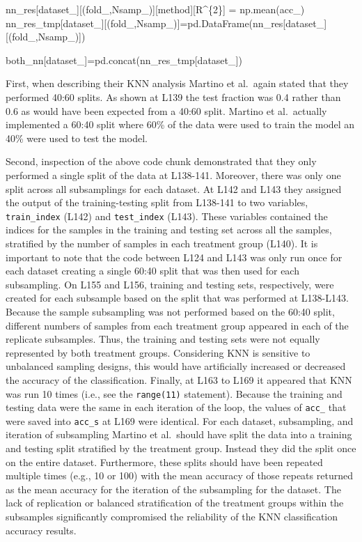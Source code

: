 \documentclass[
]{article}
\newenvironment{Shaded}{}{}
\newcommand{\NormalTok}[1]{\textcolor[rgb]{0.22,0.23,0.26}{#1}}
\newcommand{\OperatorTok}[1]{\textcolor[rgb]{0.65,0.15,0.64}{#1}}
\newcommand{\SpecialCharTok}[1]{\textcolor[rgb]{0.00,0.52,0.74}{#1}}
\newcommand{\StringTok}[1]{\textcolor[rgb]{0.31,0.63,0.31}{#1}}
\begin{document}
\begin{Shaded}
\begin{Highlighting}[numbers=left,,firstnumber=123,]
\NormalTok{        nn\_res[dataset\_][(fold\_,Nsamp\_)][method][}\StringTok{\textquotesingle{}R\^{}}\SpecialCharTok{\{2\}}\StringTok{\textquotesingle{}}\NormalTok{] }\OperatorTok{=}\NormalTok{ np.mean(acc\_)}
\NormalTok{        nn\_res\_tmp[dataset\_][(fold\_,Nsamp\_)]}\OperatorTok{=}\NormalTok{pd.DataFrame(nn\_res[dataset\_][(fold\_,Nsamp\_)])}

\NormalTok{  both\_nn[dataset\_]}\OperatorTok{=}\NormalTok{pd.concat(nn\_res\_tmp[dataset\_])}
\end{Highlighting}
\end{Shaded}

\normalsize{}

First, when describing their KNN analysis Martino et al.~again stated
that they performed 40:60 splits. As shown at L139 the test fraction was
0.4 rather than 0.6 as would have been expected from a 40:60 split.
Martino et al.~actually implemented a 60:40 split where 60\% of the data
were used to train the model an 40\% were used to test the model.

Second, inspection of the above code chunk demonstrated that they only
performed a single split of the data at L138-141. Moreover, there was
only one split across all subsamplings for each dataset. At L142 and
L143 they assigned the output of the training-testing split from
L138-141 to two variables, \texttt{train\_index} (L142) and
\texttt{test\_index} (L143). These variables contained the indices for
the samples in the training and testing set across all the samples,
stratified by the number of samples in each treatment group (L140). It
is important to note that the code between L124 and L143 was only run
once for each dataset creating a single 60:40 split that was then used
for each subsampling. On L155 and L156, training and testing sets,
respectively, were created for each subsample based on the split that
was performed at L138-L143. Because the sample subsampling was not
performed based on the 60:40 split, different numbers of samples from
each treatment group appeared in each of the replicate subsamples. Thus,
the training and testing sets were not equally represented by both
treatment groups. Considering KNN is sensitive to unbalanced sampling
designs, this would have artificially increased or decreased the
accuracy of the classification. Finally, at L163 to L169 it appeared
that KNN was run 10 times (i.e., see the \texttt{range(11)} statement).
Because the training and testing data were the same in each iteration of
the loop, the values of \texttt{acc\_} that were saved into
\texttt{acc\_s} at L169 were identical. For each dataset, subsampling,
and iteration of subsampling Martino et al.~should have split the data
into a training and testing split stratified by the treatment group.
Instead they did the split once on the entire dataset. Furthermore,
these splits should have been repeated multiple times (e.g., 10 or 100)
with the mean accuracy of those repeats returned as the mean accuracy
for the iteration of the subsampling for the dataset. The lack of
replication or balanced stratification of the treatment groups within
the subsamples significantly compromised the reliability of the KNN
classification accuracy results.
\end{document}
